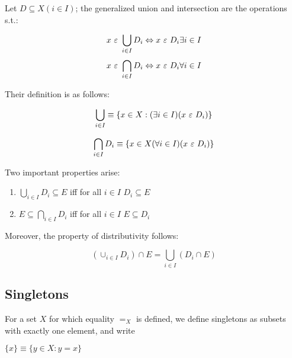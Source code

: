 \begin{definition}

  Let \(D \subseteq X (i \in I)\); the generalized union and
  intersection are the operations s.t.:

  \[ x\ \varepsilon\ \bigcup_{i\in I} D_i \Leftrightarrow x\ \varepsilon\ D_i
    \exists i \in I \]
  \[ x\ \varepsilon\ \bigcap_{i\in I} D_i \Leftrightarrow x\ \varepsilon\ D_i
    \forall i \in I \]

  Their definition is as follows:

  \[ \bigcup_{i \in I} \equiv \{ x \in X : (\exists i \in
    I)(x\ \varepsilon\ D_i) \} \]

  \[ \bigcap_{i \in I} D_i \equiv \{ x \in X (\forall i \in
    I)(x\ \varepsilon\ D_i) \} \]
\end{definition}

Two important properties arise:

\begin{enumerate}
\item \(\bigcup_{i\in I} D_i \subseteq E\) iff for all \(i \in I\)
  \(D_i\subseteq E\)
\item \(E \subseteq \bigcap_{i\in I} D_i\) iff for all \(i\in I\) \(E
  \subseteq D_i\)
\end{enumerate}

Moreover, the property of distributivity follows:

\[ (\cup_{i\in I} D_i) \cap E = \bigcup_{i\in I} (D_i \cap E)\]
% 
% 

\subsection{Singletons}
\begin{definition}[Singletons] For a set $X$ for which equality $=_X$
  is defined, we define singletons as subsets with exactly one element,
  and write

  \(\{ x\}\equiv \{ y \in X : y = x \}\)

\end{definition}





